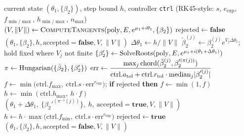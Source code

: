 \begin{algorithm}
\caption{\textsc{ArclengthStep}$(\mathrm{poly},E,\mu_1,\theta_1,\{\beta_2\},h,\mathrm{ctrl})$\\
one adaptive pseudo-arclength step: tangent prediction, exact solve, error-controlled step size, identity-preserving permutation.}
\label{alg:arclength-step}
\begin{algorithmic}[1]
\Require current state $(\theta_1,\{\beta_2\})$, step bound $h$, controller \texttt{ctrl} (RK45-style: $s$, $e_{\mathrm{exp}}$, $f_{\min/\max}$, $h_{\min/\max}$, $n_{\max}$)
\State $(V,\lVert V\rVert)\gets\textsc{ComputeTangents}(\mathrm{poly},E,e^{\mu_1+i\theta_1},\{\beta_2\})$
\State $\mathrm{rejected}\gets\mathbf{false}$
    \State \Return $(\theta_1,\{\beta_2\},h,\mathrm{accepted}{=}\mathbf{false},V,\lVert V\rVert)$ 
  \EndIf
  \State $\Delta\theta_1\gets h/\lVert V\rVert$
  \State $\tilde\beta_2^{(j)}\gets\beta_2^{(j)}e^{V_j\Delta\theta_1}$; hold fixed where $V_j$ not finite 
  \State $\{\beta_2'\}\gets\mathrm{SolveRoots}(\mathrm{poly},E,e^{\mu_1+i(\theta_1+\Delta\theta_1)})$
  \State $\pi\gets\mathrm{Hungarian}(\{\tilde\beta_2\},\{\beta_2'\})$ 
  \State $\mathrm{err}\gets\dfrac{\max_j\mathrm{chord}(\tilde\beta_2^{(j)},\beta_2'^{(\pi(j))})}{\mathrm{ctrl}.a_{\mathrm{tol}}+\mathrm{ctrl}.r_{\mathrm{tol}}\cdot\mathrm{median}_j|\beta_2'^{(j)}|}$ 
    \State $f\gets\min\!\big(\mathrm{ctrl}.f_{\max},\ \mathrm{ctrl}.s\cdot\mathrm{err}^{e_{\mathrm{exp}}}\big)$; \textbf{if} $\mathrm{rejected}$ \textbf{then} $f\gets\min(1,f)$
    \State $h\gets\min(\mathrm{ctrl}.h_{\max},\ h\cdot f)$
    \State \Return $(\theta_1+\Delta\theta_1,\ \{\beta_2'^{(\pi^{-1}(j))}\},\ h,\ \mathrm{accepted}{=}\mathbf{true},V,\lVert V\rVert)$
  \Else
    \State $h\gets h\cdot\max\big(\mathrm{ctrl}.f_{\min},\ \mathrm{ctrl}.s\cdot\mathrm{err}^{e_{\mathrm{exp}}}\big)$
    \State $\mathrm{rejected}\gets\mathbf{true}$
  \EndIf
\EndFor
\State \Return $(\theta_1,\{\beta_2\},h,\mathrm{accepted}{=}\mathbf{false},V,\lVert V\rVert)$
\end{algorithmic}
\end{algorithm}

